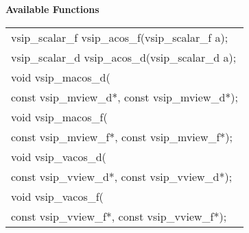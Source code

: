 \cvsiplh
\newline \hspace*{.8cm} \vspace*{.1cm} \textbf{Available Functions }
\newline \hspace*{1.1cm} {
\ttfamily
\begin{tabular}[H]{l}
vsip\_scalar\_f vsip\_acos\_f(vsip\_scalar\_f a);\\
vsip\_scalar\_d vsip\_acos\_d(vsip\_scalar\_d a);\\
void vsip\_macos\_d(\\*
\hspace{1cm}const vsip\_mview\_d*, const vsip\_mview\_d*);\\
void vsip\_macos\_f(\\*
\hspace{1cm}const vsip\_mview\_f*, const vsip\_mview\_f*);\\
void vsip\_vacos\_d(\\*
\hspace{1cm}const vsip\_vview\_d*, const vsip\_vview\_d*);\\
void vsip\_vacos\_f(\\*
\hspace{1cm}const vsip\_vview\_f*, const vsip\_vview\_f*);\\
\end{tabular}
}
\pyjvsiph
{}
